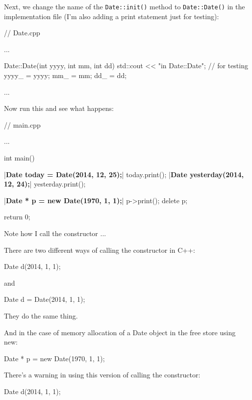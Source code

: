 Next, we change the name of the \texttt{Date::init()} method to
\texttt{Date::Date()} in the implementation file (I'm also adding a print
statement just for testing):

\begin{consolethree}[escapeinside=||]
// Date.cpp

...

Date::Date(int yyyy, int mm, int dd)
{
    std::cout << "in Date::Date\n"; // for testing
    yyyy_ = yyyy;
    mm_ = mm;
    dd_ = dd;
}

...
\end{consolethree}

Now run this and see what happens:

\begin{consolethree}[escapeinside=||]
// main.cpp

...

int main()
{
    |\textbf{Date today = Date(2014, 12, 25);}|
    today.print();
    |\textbf{Date yesterday(2014, 12, 24);}|
    yesterday.print();

    |\textbf{Date * p = new Date(1970, 1, 1);}|
    p->print();
    delete p;

    return 0;
}
\end{consolethree}

Note how I call the constructor ...

There are two different ways of calling the constructor in C++:

\begin{consolethree}[escapeinside=||]
Date d(2014, 1, 1);
\end{consolethree}

and

\begin{consolethree}[escapeinside=||]
Date d = Date(2014, 1, 1);
\end{consolethree}

They do the same thing.

And in the case of memory allocation of a Date object in the free store
using new:

\begin{consolethree}[escapeinside=||]
Date * p = new Date(1970, 1, 1);
\end{consolethree}

There's a warning in using this version of calling the constructor:

\begin{consolethree}[escapeinside=||]
Date d(2014, 1, 1);
\end{consolethree}

